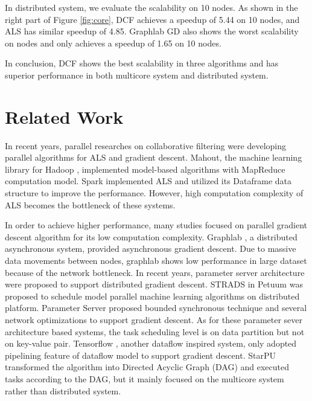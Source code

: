 \documentclass{llncs}
\begin{document}
In distributed system, we evaluate the scalability on 10 nodes. As shown in the right part of Figure \ref{fig:core}, DCF achieves a speedup of 5.44 on 10 nodes, and ALS has similar speedup of 4.85. Graphlab GD also shows the worst scalability on nodes and only achieves a speedup of 1.65 on 10 nodes.

In conclusion, DCF shows the best scalability in three algorithms and has superior performance in both multicore system and distributed system.

\vspace{-10pt}
\section{Related Work}
\label{sec:relatedWork}
\vspace{-5pt}
In recent years, parallel researches on collaborative filtering were developing parallel algorithms for ALS and gradient descent. Mahout, the machine learning library for Hadoop \cite{Hadoop}, implemented model-based algorithms with MapReduce \cite{MapReduce} computation model. Spark \cite{SparkMllib} implemented ALS \cite{SparkCF} and utilized its Dataframe \cite{dataFrame}  data structure to improve the performance. However, high computation complexity of ALS becomes the bottleneck of these systems.

In order to achieve higher performance, many studies focused on parallel gradient descent algorithm for its low computation complexity. Graphlab \cite{graphlab}, a distributed asynchronous system, provided asynchronous gradient descent. Due to massive data movements between nodes, graphlab shows low performance in large dataset because of the network bottleneck.
In recent years, parameter server architecture were proposed to support distributed gradient descent. STRADS \cite{strads} in Petuum was proposed to schedule model parallel machine learning algorithms on distributed platform. Parameter Server \cite{ps} proposed bounded synchronous technique and several network optimizations to support gradient descent. As for these parameter sever architecture based systems, the task scheduling level is on data partition but not on key-value pair. Tensorflow \cite{tensorflow}, another dataflow inspired system, only adopted pipelining feature of dataflow model to support gradient descent. StarPU \cite{StarPU} transformed the algorithm into Directed Acyclic Graph (DAG) and executed tasks according to the DAG, but it mainly focused on the multicore system rather than distributed system.
\end{document}
